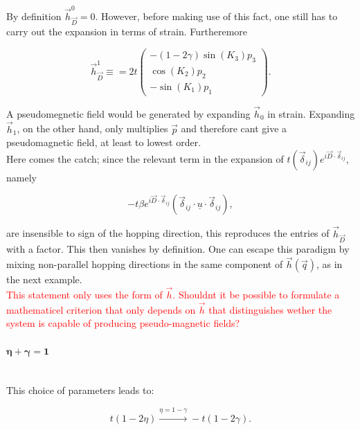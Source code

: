 \documentclass[../../../main.tex]{subfiles}
\begin{document}
By definition $\vec{h}_{\vec{D}}^0 = 0$. However, before making use of this fact, one still has to carry out the expansion in terms of strain. Furtheremore

\begin{equation}
	\vec{h}_{\vec{D}}^1 \equiv  = 2t
	\begin{pmatrix}
		-(1-2\gamma)\sin(K_3)p_3 \\
		\cos(K_2)p_2 \\
		-\sin(K_1)p_1
	\end{pmatrix}.
\end{equation}

A pseudomegnetic field would be generated by expanding $\vec{h}_0$ in strain. Expanding $\vec{h}_1$, on the other hand, only multiplies $\vec{p}$ and therefore cant give a pseudomagnetic field, at least to lowest order. \\

Here comes the catch; since the relevant term in the expansion of $t(\vec{\delta}_{ij})e^{i\vec{D}\cdot\vec{\delta}_{ij}}$, namely

\begin{equation}
	-t\beta e^{i\vec{D}\cdot\vec{\delta}_{ij}}\left( \vec{\delta}_{ij} \cdot \underline{u} \cdot \vec{\delta}_{ij} \right),
\end{equation}

are insensible to sign of the hopping direction, this reproduces the entries of $\vec{h}_{\vec{D}}$ with a factor. This then vanishes by definition. One can escape this paradigm by mixing non-parallel hopping directions in the same component of $\vec{h}(\vec{q})$, as in the next example. \\

\textcolor{red}{This statement only uses the form of $\vec{h}$. Shouldnt it be possible to formulate a mathematicel criterion that only depends on $\vec{h}$ that distinguishes wether the system is capable of producing pseudo-magnetic fields?}


\paragraph{$\mathbf{\boldsymbol{\eta} + \boldsymbol{\gamma} = 1}$} \hfill \\

This choice of parameters leads to:

\begin{equation}
	t(1-2\eta) \overset{\eta = 1-\gamma}{\longrightarrow} -t(1-2\gamma).
\end{equation}
\end{document}
